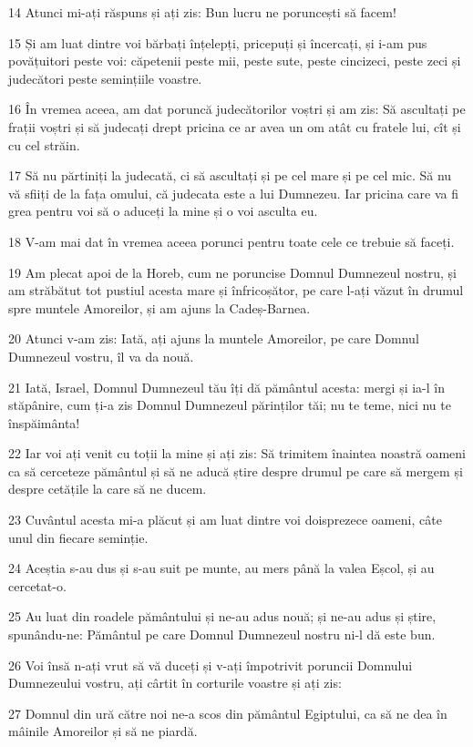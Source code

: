 \par 14 Atunci mi-ați răspuns și ați zis: Bun lucru ne poruncești să facem!
\par 15 Și am luat dintre voi bărbați înțelepți, pricepuți și încercați, și i-am pus povățuitori peste voi: căpetenii peste mii, peste sute, peste cincizeci, peste zeci și judecători peste semințiile voastre.
\par 16 În vremea aceea, am dat poruncă judecătorilor voștri și am zis: Să ascultați pe frații voștri și să judecați drept pricina ce ar avea un om atât cu fratele lui, cît și cu cel străin.
\par 17 Să nu părtiniți la judecată, ci să ascultați și pe cel mare și pe cel mic. Să nu vă sfiiți de la fața omului, că judecata este a lui Dumnezeu. Iar pricina care va fi grea pentru voi să o aduceți la mine și o voi asculta eu.
\par 18 V-am mai dat în vremea aceea porunci pentru toate cele ce trebuie să faceți.
\par 19 Am plecat apoi de la Horeb, cum ne poruncise Domnul Dumnezeul nostru, și am străbătut tot pustiul acesta mare și înfricoșător, pe care l-ați văzut în drumul spre muntele Amoreilor, și am ajuns la Cadeș-Barnea.
\par 20 Atunci v-am zis: Iată, ați ajuns la muntele Amoreilor, pe care Domnul Dumnezeul vostru, îl va da nouă.
\par 21 Iată, Israel, Domnul Dumnezeul tău îți dă pământul acesta: mergi și ia-l în stăpânire, cum ți-a zis Domnul Dumnezeul părinților tăi; nu te teme, nici nu te înspăimânta!
\par 22 Iar voi ați venit cu toții la mine și ați zis: Să trimitem înaintea noastră oameni ca să cerceteze pământul și să ne aducă știre despre drumul pe care să mergem și despre cetățile la care să ne ducem.
\par 23 Cuvântul acesta mi-a plăcut și am luat dintre voi doisprezece oameni, câte unul din fiecare seminție.
\par 24 Aceștia s-au dus și s-au suit pe munte, au mers până la valea Eșcol, și au cercetat-o.
\par 25 Au luat din roadele pământului și ne-au adus nouă; și ne-au adus și știre, spunându-ne: Pământul pe care Domnul Dumnezeul nostru ni-l dă este bun.
\par 26 Voi însă n-ați vrut să vă duceți și v-ați împotrivit poruncii Domnului Dumnezeului vostru, ați cârtit în corturile voastre și ați zis:
\par 27 Domnul din ură către noi ne-a scos din pământul Egiptului, ca să ne dea în mâinile Amoreilor și să ne piardă.

